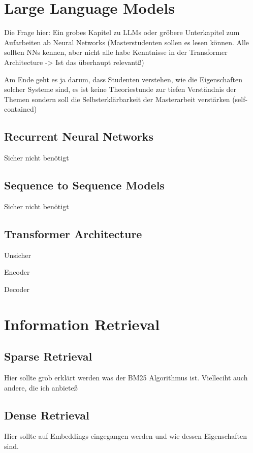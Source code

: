 \section{Large Language Models}

Die Frage hier: Ein grobes Kapitel zu LLMs oder gr\"obere Unterkapitel zum Aufarbeiten ab Neural Networks (Masterstudenten sollen es lesen k\"onnen. Alle sollten NNs kennen, aber nicht alle habe Kenntnisse in der Transformer Architecture -> Ist das \"uberhaupt relevant\ss)

Am Ende geht es ja darum, dass Studenten verstehen, wie die Eigenschaften solcher Systeme sind, es ist keine Theoriestunde zur tiefen Verst\"andnis der Themen sondern soll die Selbsterkl\"arbarkeit der Masterarbeit verst\"arken (self-contained)

\subsection{Recurrent Neural Networks}
Sicher nicht ben\"otigt
\subsection{Sequence to Sequence Models}
Sicher nicht ben\"otigt
\subsection{Transformer Architecture}
Unsicher

Encoder 

Decoder

\section{Information Retrieval}

\subsection{Sparse Retrieval}
Hier sollte grob erkl\"art werden was der BM25 Algorithmus ist. Vielleciht auch andere, die ich anbiete\ss

\subsection{Dense Retrieval}
Hier sollte auf Embeddings eingegangen werden und wie dessen Eigenschaften sind. 


